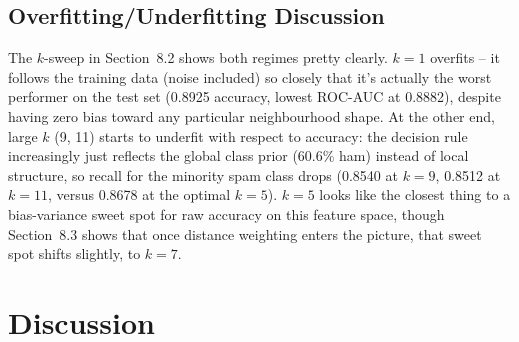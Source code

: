 \documentclass[12pt,a4paper]{article}
\begin{document}
\subsection{Overfitting/Underfitting Discussion}
The $k$-sweep in Section~8.2 shows both regimes pretty clearly. $k=1$ overfits -- it follows the training data (noise included) so closely that it's actually the worst performer on the test set (0.8925 accuracy, lowest ROC-AUC at 0.8882), despite having zero bias toward any particular neighbourhood shape. At the other end, large $k$ (9, 11) starts to underfit with respect to accuracy: the decision rule increasingly just reflects the global class prior (60.6\% ham) instead of local structure, so recall for the minority spam class drops (0.8540 at $k=9$, 0.8512 at $k=11$, versus 0.8678 at the optimal $k=5$). $k=5$ looks like the closest thing to a bias-variance sweet spot for raw accuracy on this feature space, though Section~8.3 shows that once distance weighting enters the picture, that sweet spot shifts slightly, to $k=7$.
 
\section{Discussion}
 
\end{document}
